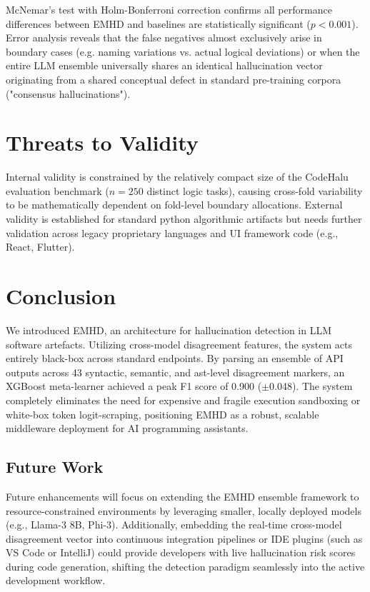\documentclass{svproc}
\newcommand{\method}{\textsc{EMHD}}
\begin{document}
McNemar's test with Holm-Bonferroni correction confirms all performance differences between EMHD and baselines are statistically significant ($p < 0.001$). 
Error analysis reveals that the false negatives almost exclusively arise in boundary cases (e.g. naming variations vs. actual logical deviations) or when the entire LLM ensemble universally shares an identical hallucination vector originating from a shared conceptual defect in standard pre-training corpora ("consensus hallucinations").

\section{Threats to Validity}\label{sec:threats}
Internal validity is constrained by the relatively compact size of the CodeHalu evaluation benchmark ($n=250$ distinct logic tasks), causing cross-fold variability to be mathematically dependent on fold-level boundary allocations. External validity is established for standard python algorithmic artifacts but needs further validation across legacy proprietary languages and UI framework code (e.g., React, Flutter).

\section{Conclusion}\label{sec:conclusion}
We introduced \method{}, an architecture for hallucination detection in LLM software artefacts. Utilizing cross-model disagreement features, the system acts entirely black-box across standard endpoints. By parsing an ensemble of API outputs across 43 syntactic, semantic, and ast-level disagreement markers, an XGBoost meta-learner achieved a peak F1 score of 0.900 ($\pm 0.048$). The system completely eliminates the need for expensive and fragile execution sandboxing or white-box token logit-scraping, positioning EMHD as a robust, scalable middleware deployment for AI programming assistants.

\subsection{Future Work}
Future enhancements will focus on extending the EMHD ensemble framework to resource-constrained environments by leveraging smaller, locally deployed models (e.g., Llama-3 8B, Phi-3). Additionally, embedding the real-time cross-model disagreement vector into continuous integration pipelines or IDE plugins (such as VS Code or IntelliJ) could provide developers with live hallucination risk scores during code generation, shifting the detection paradigm seamlessly into the active development workflow.
\end{document}
